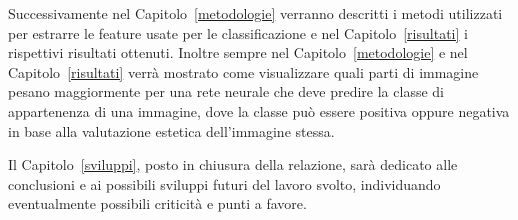 Successivamente nel Capitolo~\ref{metodologie} verranno descritti i metodi utilizzati per estrarre le feature usate per le classificazione e nel Capitolo~\ref{risultati} i rispettivi risultati ottenuti. Inoltre sempre nel Capitolo~\ref{metodologie} e nel Capitolo~\ref{risultati} verrà mostrato come visualizzare quali parti di immagine pesano maggiormente per una rete neurale che deve predire la classe di appartenenza di una immagine, dove la classe può essere positiva oppure negativa in base alla valutazione estetica dell'immagine stessa. 

Il Capitolo~\ref{sviluppi}, posto in chiusura della relazione, sarà dedicato alle conclusioni e ai possibili sviluppi futuri del lavoro svolto, individuando eventualmente possibili criticità e punti a favore.





